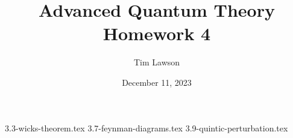 \documentclass[a4paper]{extarticle}
\title{Advanced Quantum Theory\\
\large Homework 4}
\author{Tim Lawson}
\date{December 11, 2023}
\numberwithin{equation}{subsection}
\begin{document}
\maketitle

\setcounter{section}{3}
\setcounter{subsection}{2}
{3.3-wicks-theorem.tex}
\setcounter{subsection}{6}
{3.7-feynman-diagrams.tex}
\setcounter{subsection}{8}
{3.9-quintic-perturbation.tex}
\end{document}
